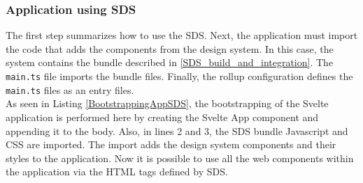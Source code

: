 \subsubsection{Application using \ac{SDS}}
The first step summarizes how to use the \acl{SDS}. Next, the application must import the code that adds the components from the design system. In this case, the system contains the bundle described in \ref{SDS_build_and_integration}.
The  \texttt{main.ts} file imports the bundle files. Finally, the rollup configuration defines the  \texttt{main.ts} files as an entry files. \\

As seen in Listing \ref{BootstrappingAppSDS}, the bootstrapping of the Svelte application is performed here by creating the Svelte App component and appending it to the body. Also, in lines 2 and 3, the SDS bundle Javascript and \ac{CSS} are imported. The import adds the design system components and their styles to the application. Now it is possible to use all the web components within the application via the \ac{HTML} tags defined by \ac{SDS}. \\


